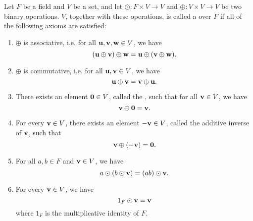 \begin{defn}
Let $ F $ be a field and $ V $ be a set, and let $ \odot:F\times V\to V $ and $ \oplus:V\times V\to V $ be two binary operations. $ V $, together with these operations, is called a  over $ F $ if all of the following axioms are satisfied:
\begin{enumerate}
    \item\label{axiom:vect1} $ \oplus $ is associative, i.e. for all $ \mathbf{u},\mathbf{v},\mathbf{w}\in V $, we have
    \begin{equation*}
        (\mathbf{u}\oplus\mathbf{v})\oplus\mathbf{w}=\mathbf{u}\oplus(\mathbf{v}\oplus\mathbf{w}).
    \end{equation*}

    \item\label{axiom:vect2} $ \oplus $ is commutative, i.e. for all $ \mathbf{u},\mathbf{v}\in V $, we have
    \begin{equation*}
        \mathbf{u}\oplus\mathbf{v}=\mathbf{v}\oplus\mathbf{u}.
    \end{equation*}

    \item\label{axiom:vect3} There exists an element $ \mathbf{0}\in V $, called the , such that for all $ \mathbf{v}\in V $, we have
    \begin{equation*}
        \mathbf{v}\oplus\mathbf{0}=\mathbf{v}.
    \end{equation*}

    \item\label{axiom:vect4} For every $ \mathbf{v}\in V $, there exists an element $ -\mathbf{v}\in V $\!, called the additive inverse of $ \mathbf{v} $, such that
    \begin{equation*}
        \mathbf{v}\oplus(-\mathbf{v})=\mathbf{0}.
    \end{equation*}

    \item\label{axiom:vect5} For all $ a,b\in F $ and $ \mathbf{v}\in V $, we have
    \begin{equation*}
        a\odot (b\odot\mathbf{v})=(ab)\odot\mathbf{v}.
    \end{equation*}

    \item\label{axiom:vect6} For every $ \mathbf{v}\in V $, we have
    \begin{equation*}
        1_F\odot\mathbf{v}=\mathbf{v}
    \end{equation*}
    where $ 1_F $ is the multiplicative identity of $ F $.


\end{enumerate}
\end{defn}
